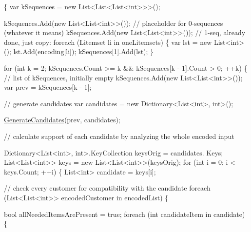 \begin{DoxyCode}
                                                                               
                          \{
            var kSequences = \textcolor{keyword}{new} List<List<List<int>>>();

            kSequences.Add(\textcolor{keyword}{new} List<List<int>>()); \textcolor{comment}{// placeholder for
       0-sequences (whatever it means)}
            kSequences.Add(\textcolor{keyword}{new} List<List<int>>()); \textcolor{comment}{// 1-seq, already done, just
       copy:}
            \textcolor{keywordflow}{foreach} (Litemset li \textcolor{keywordflow}{in} oneLitemsets) \{
                var lst = \textcolor{keyword}{new} List<int>();
                lst.Add(encoding[li]);
                kSequences[1].Add(lst);
            \}

            \textcolor{keywordflow}{for} (\textcolor{keywordtype}{int} k = 2; kSequences.Count >= k && kSequences[k - 1].Count > 
      0; ++k) \{
                \textcolor{comment}{// list of kSequences, initially empty}
                kSequences.Add(\textcolor{keyword}{new} List<List<int>>());
                var prev = kSequences[k - 1];

                \textcolor{comment}{// generate candidates}
                var candidates = \textcolor{keyword}{new} Dictionary<List<int>, \textcolor{keywordtype}{int}>();

                \hyperlink{class_apriori_all_lib_1_1_apriori_all_algorithm_a1cb8e7f04ae25e5bc2203d35ba7fced3}{GenerateCandidates}(prev, candidates);

                \textcolor{comment}{// calculate support of each candidate by analyzing the whole
       encoded input}

                Dictionary<List<int>, \textcolor{keywordtype}{int}>.KeyCollection keysOrig = candidates.
      Keys;
                List<List<int>> keys = \textcolor{keyword}{new} List<List<int>>(keysOrig);
                \textcolor{keywordflow}{for} (\textcolor{keywordtype}{int} i = 0; i < keys.Count; ++i) \{
                    List<int> candidate = keys[i];

                    \textcolor{comment}{// check every customer for compatibility with the
       candidate}
                    \textcolor{keywordflow}{foreach} (List<List<int>> encodedCustomer \textcolor{keywordflow}{in} encodedList) \{

                        \textcolor{keywordtype}{bool} allNeededItemsArePresent = \textcolor{keyword}{true};
                        \textcolor{keywordflow}{foreach} (\textcolor{keywordtype}{int} candidateItem \textcolor{keywordflow}{in} candidate) \{


\end{DoxyCode}
